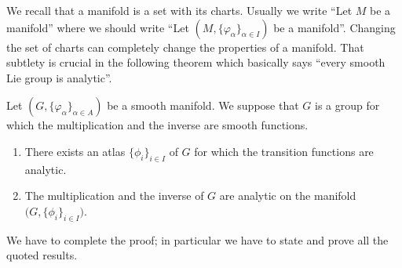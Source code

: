 We recall that a manifold is a set with its charts. Usually we write ``Let \( M\) be a manifold'' where we should write ``Let \( (M,\{ \varphi_{\alpha} \}_{\alpha\in I})\) be a manifold''. Changing the set of charts can completely change the properties of a manifold. That subtlety is crucial in the following theorem which basically says ``every smooth Lie group is analytic''.
\begin{theorem}       \label{THOooSQVCooCyEPOS}
    Let \( (G,\{ \varphi_{\alpha} \}_{\alpha\in A})\) be a smooth manifold. We suppose that \( G\) is a group for which the multiplication and the inverse are smooth functions.

    \begin{enumerate}
        \item
            There exists an atlas \( \{ \phi_i \}_{i\in I}\) of \( G\) for which the transition functions are analytic.
        \item
            The multiplication and the inverse of \( G\) are analytic on the manifold \( \big( G,\{ \phi_i \}_{i\in I} \big)\).
    \end{enumerate}
\end{theorem}

\begin{probleme}
    We have to complete the proof; in particular we have to state and prove all the quoted results.
\end{probleme}


